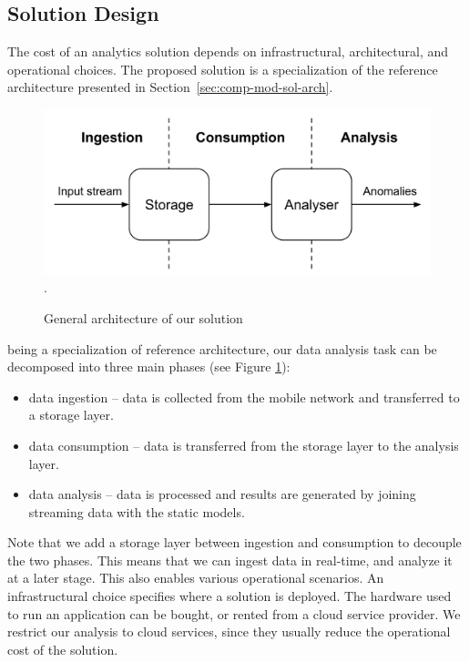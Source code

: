 {\subsection{Solution Design} \label{sec:solutions}
The cost of an analytics solution depends on infrastructural, architectural, and operational choices. The proposed solution is a specialization of the reference architecture presented in Section~\ref{sec:comp-mod-sol-arch}.

\begin{figure}[ht]
  \centering
  \includegraphics[width=.7\textwidth]{img/eval-arch-1}.
    \caption{General architecture of our solution}
    \label{fig:arch_abs}
\end{figure}

being a specialization of \river{} reference architecture, our data analysis task can be decomposed into three main phases (see Figure \ref{fig:arch_abs}):
\begin{itemize}
\item data ingestion -- data is collected from the mobile network and transferred to a storage layer.
\item data consumption -- data is transferred from the storage layer to the analysis layer.
\item data analysis -- data is processed and results are generated by joining streaming data with the static models.
\end{itemize}

Note that we add a storage layer between ingestion and consumption to decouple the two phases. This means that we can ingest data in real-time, and analyze it at a later stage. This also enables various operational scenarios.
An infrastructural choice specifies where a solution is deployed. The hardware used to run an application can be bought, or rented from a cloud service provider. We restrict our analysis to cloud services, since they usually reduce the operational cost of the solution.

}
